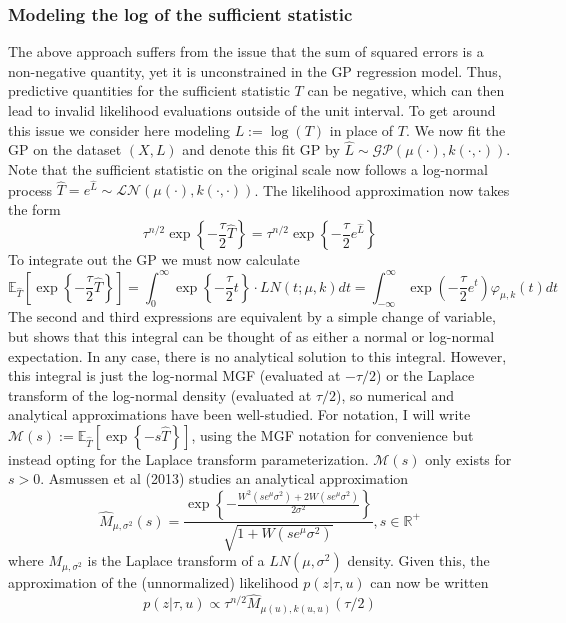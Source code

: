 \documentclass[12pt]{article}
\newcommand{\E}{\mathbb{E}}
\newcommand{\R}{\mathcal{R}}
\def\R{\mathbb{R}}
\begin{document}
\subsubsection{Modeling the log of the sufficient statistic}
The above approach suffers from the issue that the sum of squared errors is a non-negative quantity, yet it is unconstrained in the GP regression model. Thus, predictive quantities for the 
sufficient statistic $T$ can be negative, which can then lead to invalid likelihood evaluations outside of the unit interval. To get around this issue we consider here modeling $L := \log(T)$ in place 
of $T$. We now fit the GP on the dataset $(X, L)$ and denote this fit GP by $\hat{L} \sim \mathcal{GP}(\mu(\cdot), k(\cdot, \cdot))$. Note that the sufficient statistic on the original scale now follows
a log-normal process $\hat{T} = e^{\hat{L}} \sim \mathcal{LN}(\mu(\cdot), k(\cdot, \cdot))$. The likelihood approximation now takes the form
\[\tau^{n/2}\exp\left\{-\frac{\tau}{2}\hat{T} \right\} = \tau^{n/2}\exp\left\{-\frac{\tau}{2}e^{\hat{L}} \right\} \]
To integrate out the GP we must now calculate
\[\E_{\hat{T}}\left[\exp\left\{-\frac{\tau}{2}\hat{T} \right\}  \right] = \int_{0}^{\infty} \exp\left\{-\frac{\tau}{2}t \right\} \cdot LN(t; \mu, k) dt = \int_{-\infty}^{\infty} \exp\left(-\frac{\tau}{2}e^t \right) \varphi_{\mu, k}(t) dt\]
The second and third expressions are equivalent by a simple change of variable, but shows that this integral can be thought of as either a normal or log-normal expectation. In any case, there is no analytical 
solution to this integral. However, this integral is just the log-normal MGF (evaluated at $-\tau/2$) or the Laplace transform of the log-normal density (evaluated at $\tau/2$), so numerical and analytical approximations
have been well-studied. For notation, I will write 
$\mathcal{M}(s) := \E_{\hat{T}}\left[\exp\left\{-s\hat{T} \right\}  \right]$, using the MGF notation for convenience but instead opting for the Laplace transform parameterization. $\mathcal{M}(s)$ only exists 
for $s > 0$. Asmussen et al (2013) studies an analytical approximation
\[\hat{M}_{\mu, \sigma^2}(s) = \frac{\exp\left\{-\frac{W^2(se^\mu \sigma^2) + 2W(se^\mu \sigma^2)}{2\sigma^2}\right\}}{\sqrt{1 + W(se^\mu \sigma^2)}}, s \in \R^+\]
where $M_{\mu, \sigma^2}$ is the Laplace transform of a $LN(\mu, \sigma^2)$ density. Given this, the approximation of the (unnormalized) likelihood $p(z|\tau, u)$ can now be written
\[p(z|\tau, u) \propto \tau^{n/2} \hat{M}_{\mu(u), k(u,u)}(\tau/2)\]
\end{document}
